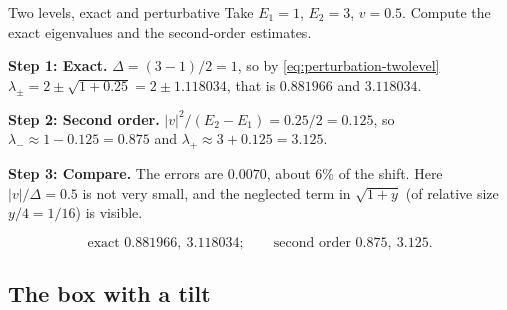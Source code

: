 \begin{sample}{Two levels, exact and perturbative}
Take $E_1=1$, $E_2=3$, $v=0.5$. Compute the exact eigenvalues and the second-order estimates.

\textbf{Step 1: Exact.} $\Delta=(3-1)/2=1$, so by \cref{eq:perturbation-twolevel} $\lambda_\pm=2\pm\sqrt{1+0.25}=2\pm1.118034$, that is $0.881966$ and $3.118034$.

\textbf{Step 2: Second order.} $|v|^2/(E_2-E_1)=0.25/2=0.125$, so $\lambda_-\approx1-0.125=0.875$ and $\lambda_+\approx3+0.125=3.125$.

\textbf{Step 3: Compare.} The errors are $0.0070$, about 6\% of the shift. Here $|v|/\Delta=0.5$ is not very small, and the neglected term in $\sqrt{1+y}$ (of relative size $y/4=1/16$) is visible.

\[
\boxed{\text{exact }0.881966,\ 3.118034;\qquad\text{second order }0.875,\ 3.125.}
\]
\end{sample}

\subsection{The box with a tilt}

